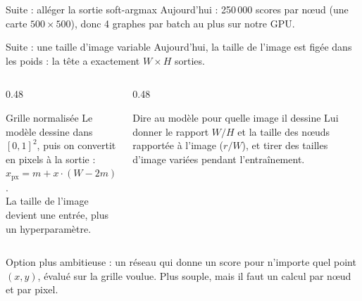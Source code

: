 \documentclass[aspectratio=169,11pt]{beamer}
\begin{document}
\begin{frame}{Suite : alléger la sortie soft-argmax}
\small Aujourd'hui : 250\,000 scores par nœud (une carte $500 \times 500$), donc 4 graphes par batch au plus sur notre GPU.

\vspace{0.4cm}
\centering
{}
\end{frame}

\begin{frame}{Suite : une taille d'image variable}
\small Aujourd'hui, la taille de l'image est figée dans les poids : la tête a exactement $W \times H$ sorties.

\vspace{0.3cm}
\begin{columns}[T]
\begin{column}{0.48\textwidth}
\begin{block}{Grille normalisée}
\small Le modèle dessine dans $[0,1]^2$, puis on convertit en pixels à la sortie :\\
$x_{\text{px}} = m + x \cdot (W - 2m)$.\\
La taille de l'image devient une entrée, plus un hyperparamètre.
\end{block}
\end{column}
\begin{column}{0.48\textwidth}
\begin{block}{Dire au modèle pour quelle image il dessine}
\small Lui donner le rapport $W/H$ et la taille des nœuds rapportée à l'image ($r/W$), et tirer des tailles d'image variées pendant l'entraînement.
\end{block}
\end{column}
\end{columns}

\vspace{0.3cm}
\scriptsize\textcolor{gris}{Option plus ambitieuse : un réseau qui donne un score pour n'importe quel point $(x, y)$, évalué sur la grille voulue. Plus souple, mais il faut un calcul par nœud et par pixel.}
\end{frame}
\end{document}
